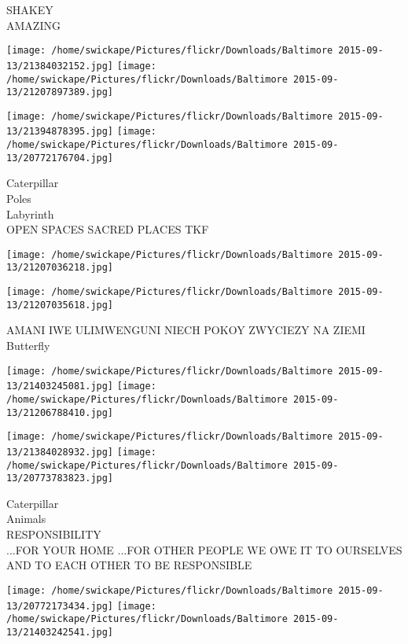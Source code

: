 \documentclass[10pt,letterpaper]{article}
\begin{document}
SHAKEY\\
AMAZING\\
\pagebreak

\texttt{[image: /home/swickape/Pictures/flickr/Downloads/Baltimore 2015-09-13/21384032152.jpg]}
\texttt{[image: /home/swickape/Pictures/flickr/Downloads/Baltimore 2015-09-13/21207897389.jpg]}

\texttt{[image: /home/swickape/Pictures/flickr/Downloads/Baltimore 2015-09-13/21394878395.jpg]}
\texttt{[image: /home/swickape/Pictures/flickr/Downloads/Baltimore 2015-09-13/20772176704.jpg]}

Caterpillar\\
Poles\\
Labyrinth\\
OPEN SPACES SACRED PLACES TKF\\
\pagebreak

\texttt{[image: /home/swickape/Pictures/flickr/Downloads/Baltimore 2015-09-13/21207036218.jpg]}

\vspace{0.25in}
\texttt{[image: /home/swickape/Pictures/flickr/Downloads/Baltimore 2015-09-13/21207035618.jpg]}

AMANI IWE ULIMWENGUNI NIECH POKOY ZWYCIEZY NA ZIEMI\\
Butterfly\\
\pagebreak

\texttt{[image: /home/swickape/Pictures/flickr/Downloads/Baltimore 2015-09-13/21403245081.jpg]}
\texttt{[image: /home/swickape/Pictures/flickr/Downloads/Baltimore 2015-09-13/21206788410.jpg]}

\texttt{[image: /home/swickape/Pictures/flickr/Downloads/Baltimore 2015-09-13/21384028932.jpg]}
\texttt{[image: /home/swickape/Pictures/flickr/Downloads/Baltimore 2015-09-13/20773783823.jpg]}

Caterpillar\\
Animals\\
RESPONSIBILITY\\
...FOR YOUR HOME ...FOR OTHER PEOPLE WE OWE IT TO OURSELVES AND TO EACH OTHER TO BE RESPONSIBLE\\
\pagebreak

\texttt{[image: /home/swickape/Pictures/flickr/Downloads/Baltimore 2015-09-13/20772173434.jpg]}
\texttt{[image: /home/swickape/Pictures/flickr/Downloads/Baltimore 2015-09-13/21403242541.jpg]}
\end{document}
